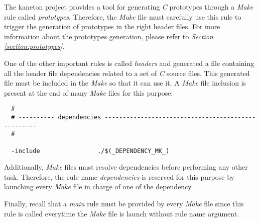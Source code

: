 The kaneton project provides a tool for generating \textit{C} prototypes
through a \textit{Make} rule called \textit{prototypes}. Therefore, the
\textit{Make} file must carefully use this rule to trigger the generation
of prototypes in the right header files. For more information about the
prototypes generation, please refer to \textit{Section
\ref{section:prototypes}}.

One of the other important rules is called \textit{headers} and generated
a file containing all the header file dependencies related to a set of
\textit{C} source files. This generated file must be included in the
\textit{Make} so that it can use it. A \textit{Make} file inclusion is
present at the end of many \textit{Make} files for this purpose:

\begin{verbatim}
  #
  # ---------- dependencies ---------------------------------------------------
  #

  -include                ./$(_DEPENDENCY_MK_)
\end{verbatim}

Additionally, \textit{Make} files must resolve dependencies before performing
any other task. Therefore, the rule name \textit{dependencies} is reserved
for this purpose by launching every \textit{Make} file in charge of one of
the dependency.

Finally, recall that a \textit{main} rule must be provided by every
\textit{Make} file since this rule is called everytime the \textit{Make}
file is launch without rule name argument.

